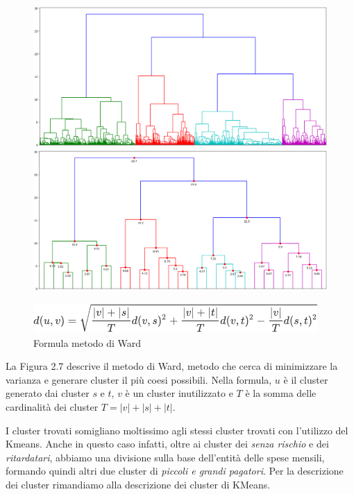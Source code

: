 \begin{figure}[!htb]
  \includegraphics[width=\linewidth]{img/euclidean-ward.png}
  \caption{}\label{euward}
\endminipage\hfill
{}
  \includegraphics[width=\linewidth]{img/euclidean-ward-truncate.png}
  \caption{}\label{euwardtrunc}
\endminipage\hfill
\end{figure}

\begin{figure}[H]
\includegraphics[width=0.5\linewidth]{img/ward_linkage.png}
\centering
\caption{Formula metodo di Ward}
\label{dendro-complete}
\end{figure} 

La Figura 2.7 descrive il metodo di Ward, metodo che cerca di minimizzare la varianza e generare cluster il pi\`u coesi possibili. Nella formula, $u$ \`e il cluster generato dai cluster $s$ e $t$, $v$ \`e un cluster inutilizzato e $T$ \`e la somma delle cardinalità dei cluster $T = |v| + |s| + |t|$.

I cluster trovati somigliano moltissimo agli stessi cluster trovati con l'utilizzo del Kmeans.
Anche in questo caso infatti, oltre ai cluster dei \textit{senza rischio} e
dei \textit{ritardatari}, abbiamo una divisione sulla base dell'entit\`a delle spese
mensili, formando quindi altri due cluster di \textit{piccoli e grandi pagatori}.
Per la descrizione dei cluster rimandiamo alla descrizione dei cluster di KMeans.

